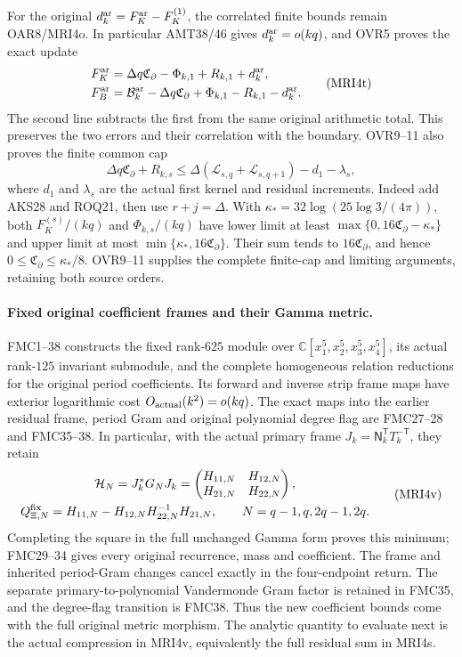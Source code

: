 \documentclass[11pt,a4paper]{article}
\begin{document}
For the original $d_k^{\rm ar}=F_K^{\rm ar}-F_K^{(1)}$, the
correlated finite bounds remain OAR8/MRI4o. In particular AMT38/46
gives $d_k^{\rm ar}=o(kq)$, and OVR5 proves the exact update
\[
 \begin{split}
 F_K^{\rm ar}
   &=\Delta q\mathfrak C_\partial-\Phi_{k,1}+R_{k,1}+d_k^{\rm ar},\\
 F_B^{\rm ar}
   &=\mathcal B_k^{\rm ar}-\Delta q\mathfrak C_\partial
                 +\Phi_{k,1}-R_{k,1}-d_k^{\rm ar}.
 \end{split}\tag{MRI4t}
\]
The second line subtracts the first from the same original arithmetic
total. This preserves the two errors and their correlation with the
boundary. OVR9--11 also proves the finite common cap
\[
 \Delta q\mathfrak C_\partial+R_{k,s}
 \le\Delta(\mathcal L_{s,q}+\mathcal L_{s,q+1})-d_1-\lambda_s,
 \tag{MRI4u}
\]
where $d_1$ and $\lambda_s$ are the actual first kernel and residual
increments. Indeed add AKS28 and ROQ21, then use $r+j=\Delta$.
With $\kappa_*=32\log(25\log3/(4\pi))$, both
$F_K^{(s)}/(kq)$ and $\Phi_{k,s}/(kq)$ have lower limit at least
$\max\{0,16\mathfrak C_\partial-\kappa_*\}$ and upper limit at
most $\min\{\kappa_*,16\mathfrak C_\partial\}$.
Their sum tends to $16\mathfrak C_\partial$, and hence
$0\le\mathfrak C_\partial\le\kappa_*/8$. OVR9--11 supplies the
complete finite-cap and limiting arguments, retaining both source orders.

\paragraph{Fixed original coefficient frames and their Gamma metric.}
FMC1--38 constructs the fixed rank-$625$ module over
$\mathbb C[x_1^5,x_2^5,x_3^5,x_4^5]$, its actual rank-$125$
invariant submodule, and the complete homogeneous relation reductions
for the original period coefficients. Its forward and inverse strip
frame maps have exterior logarithmic cost $O_{\rm actual}(k^2)=o(kq)$.
The exact maps into the earlier residual frame, period Gram and original
polynomial degree flag are FMC27--28 and FMC35--38.
In particular, with the actual primary frame
$J_k=\mathsf N_k^{\mathsf T}T_k^{-\mathsf T}$, they retain
\[
 \begin{gathered}
 \mathcal H_N=J_k^*G_NJ_k
   =\begin{pmatrix}H_{11,N}&H_{12,N}\\H_{21,N}&H_{22,N}\end{pmatrix},\\
 Q_{\Xi,N}^{\rm fix}=H_{11,N}-H_{12,N}H_{22,N}^{-1}H_{21,N},
 \qquad N=q-1,q,2q-1,2q.
 \end{gathered}\tag{MRI4v}
\]
Completing the square in the full unchanged Gamma form proves this
minimum; FMC29--34 gives every original recurrence, mass and coefficient.
The frame and inherited period-Gram changes cancel exactly in the
four-endpoint return. The separate primary-to-polynomial Vandermonde
Gram factor is retained in FMC35, and the degree-flag transition is
FMC38. Thus the new coefficient bounds come with the full original
metric morphism. The analytic quantity to evaluate next is the actual
compression in MRI4v, equivalently the full residual sum in MRI4s.
\end{document}
